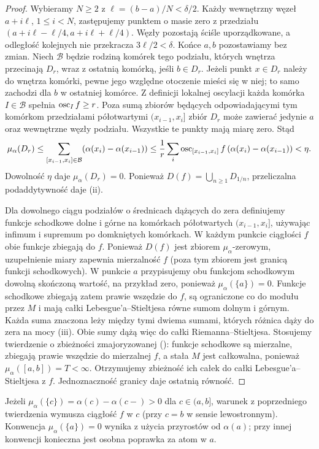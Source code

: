 \begin{proof}
Wybieramy $N\ge2$ z $\ell=(b-a)/N<\delta/2$. Każdy wewnętrzny węzeł $a+i\ell$, $1\le i<N$, zastępujemy punktem o masie zero z przedziału $(a+i\ell-\ell/4,a+i\ell+\ell/4)$. Węzły pozostają ściśle uporządkowane, a odległość kolejnych nie przekracza $3\ell/2<\delta$. Końce $a,b$ pozostawiamy bez zmian. Niech $\mathcal B$ będzie rodziną komórek tego podziału, których wnętrza przecinają $D_r$, wraz z ostatnią komórką, jeśli $b\in D_r$. Jeżeli punkt $x\in D_r$ należy do wnętrza komórki, pewne jego względne otoczenie mieści się w niej; to samo zachodzi dla $b$ w ostatniej komórce. Z definicji lokalnej oscylacji każda komórka $I\in\mathcal B$ spełnia $\operatorname{osc}_I f\ge r$. Poza sumą zbiorów będących odpowiadającymi tym komórkom przedziałami półotwartymi $(x_{i-1},x_i]$ zbiór $D_r$ może zawierać jedynie $a$ oraz wewnętrzne węzły podziału. Wszystkie te punkty mają miarę zero. Stąd
\[
 \mu_\alpha(D_r)\le\sum_{[x_{i-1},x_i]\in\mathcal B}
 (\alpha(x_i)-\alpha(x_{i-1}))
 \le\frac1r\sum_i\operatorname{osc}_{[x_{i-1},x_i]}f\,(\alpha(x_i)-\alpha(x_{i-1}))<\eta.
\]
Dowolność $\eta$ daje $\mu_\alpha(D_r)=0$. Ponieważ $D(f)=\bigcup_{n\ge1}D_{1/n}$, przeliczalna podaddytywność daje (ii).

Dla dowolnego ciągu podziałów o średnicach dążących do zera definiujemy funkcje schodkowe dolne i górne na komórkach półotwartych $(x_{i-1},x_i]$, używając infimum i supremum po domkniętych komórkach. W każdym punkcie ciągłości $f$ obie funkcje zbiegają do $f$. Ponieważ $D(f)$ jest zbiorem $\mu_\alpha$-zerowym, uzupełnienie miary zapewnia mierzalność $f$ (poza tym zbiorem jest granicą funkcji schodkowych). W punkcie $a$ przypisujemy obu funkcjom schodkowym dowolną skończoną wartość, na przykład zero, ponieważ $\mu_\alpha(\{a\})=0$. Funkcje schodkowe zbiegają zatem prawie wszędzie do $f$, są ograniczone co do modułu przez $M$ i mają całki Lebesgue'a--Stieltjesa równe sumom dolnym i górnym. Każda suma znaczona leży między tymi dwiema sumami, których różnica dąży do zera na mocy (iii). Obie sumy dążą więc do całki Riemanna--Stieltjesa. Stosujemy twierdzenie o zbieżności zmajoryzowanej
():
funkcje schodkowe są mierzalne, zbiegają prawie wszędzie
do mierzalnej $f$, a stała $M$ jest całkowalna, ponieważ
$\mu_\alpha([a,b])=T<\infty$. Otrzymujemy zbieżność
ich całek do całki Lebesgue'a--Stieltjesa z $f$. Jednoznaczność granicy daje ostatnią równość.
\end{proof}
\begin{uwaga}
Jeżeli $\mu_\alpha(\{c\})=\alpha(c)-\alpha(c-)>0$ dla $c\in(a,b]$, warunek z poprzedniego twierdzenia wymusza ciągłość $f$ w $c$ (przy $c=b$ w sensie lewostronnym). Konwencja $\mu_\alpha(\{a\})=0$ wynika z użycia przyrostów od $\alpha(a)$; przy innej konwencji konieczna jest osobna poprawka za atom w $a$.
\end{uwaga}
